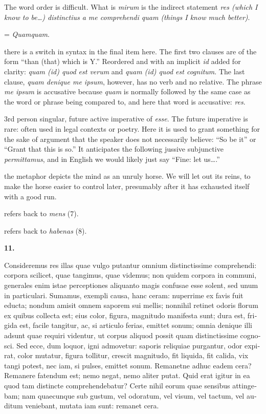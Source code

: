  The word order is difficult. What is \textit{mirum} is the indirect statement \textit{res (which I know to be\dots) distinctius a me comprehendi quam (things I know much better)}.

 = \textit{Quamquam}.

 there is a switch in syntax in the final item here. The first two clauses are  of the form ``than (that) which is Y.'' Reordered and with an implicit \textit{id} added for clarity: \textit{quam (id) quod est verum} and \textit{quam (id) quod est cognitum}. The last clause, \textit{quam denique me ipsum}, however, has no verb and no relative. The phrase \textit{me ipsum} is accusative because \textit{quam} is normally followed by the same case as the word or phrase being compared to, and here that word is accusative: \textit{res}.

 3rd person singular, future active imperative of \textit{esse}. The future imperative is rare: often used in legal contexts or poetry. Here it is used to grant something for the sake of argument that the speaker does not necessarily believe: ``So be it'' or ``Grant that this is so.'' It anticipates the following jussive subjunctive \textit{permittamus}, and in English we would likely just say ``Fine: let us\dots.''

 the metaphor depicts the mind as an unruly horse. We will let out its reins, to make the horse easier to control later, presumably after it has exhausted itself with a good run.

 refers back to \textit{mens} (7).

 refers back to \textit{habenas} (8).

\clearpage

\beginnumbering
\pstart
    \textbf{11.} \begin{latin}Consideremus res illas quae vulgo putantur omnium distinctissime comprehendi: corpora scilicet, quae tangimus, quae videmus; non quidem corpora in communi, generales enim istae perceptiones aliquanto magis confusae esse solent, sed unum in particulari. Sumamus, exempli causa, hanc ceram: nuperrime ex favis fuit educta; nondum amisit omnem saporem sui mellis; nonnihil retinet odoris florum ex quibus collecta est; eius color, figura, magnitudo manifesta sunt; dura est, frigida est, facile tangitur, ac, si articulo ferias, emittet sonum; omnia denique illi adsunt quae requiri videntur, ut corpus aliquod possit quam distinctissime cognosci. Sed ecce, dum loquor, igni admovetur: saporis reliquiae purgantur, odor expirat, color mutatur, figura tollitur, crescit magnitudo, fit liquida, fit calida, vix tangi potest, nec iam, si pulses, emittet sonum. Remanetne adhuc eadem cera? Remanere fatendum est; nemo negat, nemo aliter putat. Quid erat igitur in ea quod tam distincte comprehendebatur? Certe nihil eorum quae sensibus attingebam; nam quaecunque sub gustum, vel odoratum, vel visum, vel tactum, vel auditum veniebant, mutata iam sunt: remanet cera.\end{latin}
\pend
\endnumbering

